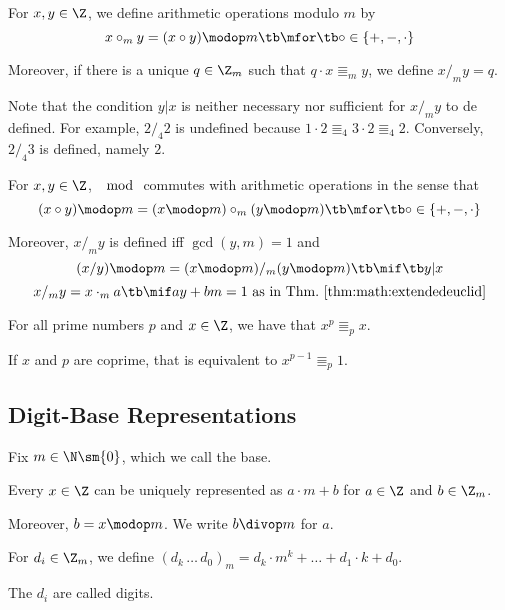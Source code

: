\begin{definition}\label{def:math:moduloarith}
For $x,y\in\Z$, we define arithmetic operations modulo $m$ by \[x\circ_m y = (x\circ y)\modop m \tb\mfor\tb \circ \in\{+,-,\cdot\}\]

Moreover, if there is a unique $q\in\Z_m$ such that $q\cdot x\Equiv_m y$, we define $x/_m y=q$.
\end{definition}

Note that the condition $y|x$ is neither necessary nor sufficient for $x/_m y$ to de defined.
For example, $2/_4 2$ is undefined because $1\cdot 2\Equiv_4 3\cdot 2\Equiv_4 2$.
Conversely, $2/_4 3$ is defined, namely $2$.

\begin{theorem}\label{thm:math:moduloarith}
For $x,y\in\Z$, $\mod$ commutes with arithmetic operations in the sense that
 \[(x\circ y)\modop m=(x\modop m)\circ_m (y\modop m) \tb\mfor\tb \circ \in\{+,-,\cdot\}\]

Moreover, $x/_m y$ is defined iff $\gcd(y,m)=1$ and
 \[(x/y)\modop m=(x \modop m)/_m (y\modop m) \tb\mif\tb y|x\]
 \[x/_m y=x\cdot_m a \tb\mif ay+bm=1 \text{ as in Thm.~\ref{thm:math:extendedeuclid}}\]
\end{theorem}

\begin{theorem}\label{thm:math:fermatlittle}
For all prime numbers $p$ and $x\in\Z$, we have that $x^p\Equiv_p x$.

If $x$ and $p$ are coprime, that is equivalent to $x^{p-1}\Equiv_p 1$.
\end{theorem}

\subsection{Digit-Base Representations}\label{sec:math:base}

Fix $m\in \N\sm\{0\}$, which we call the base.
\medskip

\begin{theorem}
Every $x\in\Z$ can be uniquely represented as $a\cdot m+b$ for $a\in\Z$ and $b\in\Z_m$.

Moreover, $b=x\modop m$.
We write $b\divop m$ for $a$.
\end{theorem}

\begin{definition}\label{def:math:base}
For $d_i\in\Z_m$, we define $(d_k\,\ldots\,d_0)_m =d_k\cdot m^k+\ldots+d_1\cdot k+d_0$.

The $d_i$ are called digits.
\end{definition}

